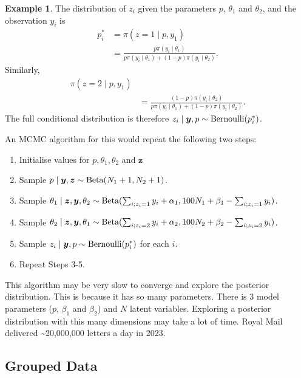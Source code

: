 \documentclass[
]{book}
\providecommand{\tightlist}{%
  \setlength{\itemsep}{0pt}\setlength{\parskip}{0pt}}
\theoremstyle{definition}
\theoremstyle{definition}
\newtheorem{example}{Example}[chapter]
\theoremstyle{definition}
\theoremstyle{definition}
\theoremstyle{remark}
\begin{document}
\begin{example}
The distribution of \(z_i\) given the parameters \(p\), \(\theta_1\) and \(\theta_2\), and the observation \(y_i\) is
\begin{align*}
p^*_i & = \pi(z = 1 \mid p, y_1) \\
&= \frac{p\pi(y_i \mid \theta_1)}{p\pi(y_i \mid \theta_1) + (1-p)\pi(y_i \mid \theta_2)}.
\end{align*}
Similarly,
\begin{align*}
\pi(z = 2 \mid p, y_1) \\
&= \frac{(1-p)\pi(y_i \mid \theta_2)}{p\pi(y_i \mid \theta_1) + (1-p)\pi(y_i \mid \theta_2)}.
\end{align*}
The full conditional distribution is therefore \(z_i \mid \boldsymbol{y}, p \sim \hbox{Bernoulli}(p^*_i)\).

An MCMC algorithm for this would repeat the following two steps:

\begin{enumerate}
\def\labelenumi{\arabic{enumi}.}
\tightlist
\item
  Initialise values for \(p, \theta_1, \theta_2\) and \(\boldsymbol{z}\)
\item
  Sample \(p \mid \boldsymbol{y}, \boldsymbol{z} \sim \hbox{Beta}(N_1 + 1, N_2 + 1)\).
\item
  Sample \(\theta_1 \mid \boldsymbol{z}, \boldsymbol{y}, \theta_2 \sim\hbox{Beta}(\sum_{i; z_i = 1}y_i + \alpha_1 , 100N_1 + \beta_1 - \sum_{i; z_i = 1}y_i)\).
\item
  Sample \(\theta_2 \mid \boldsymbol{z}, \boldsymbol{y}, \theta_1 \sim \hbox{Beta}(\sum_{i; z_i = 2}y_i + \alpha_2 , 100N_2 + \beta_2 - \sum_{i; z_i = 2}y_i)\).
\item
  Sample \(z_i \mid \boldsymbol{y}, p \sim \hbox{Bernoulli}(p^*_i)\) for each \(i\).
\item
  Repeat Steps 3-5.
\end{enumerate}

This algorithm may be very slow to converge and explore the posterior distribution. This is because it has so many parameters. There is 3 model parameters (\(p\), \(\beta_1\) and \(\beta_2\)) and \(N\) latent variables. Exploring a posterior distribution with this many dimensions may take a lot of time. Royal Mail delivered \textasciitilde20,000,000 letters a day in 2023.
\end{example}

\hypertarget{grouped-data}{%
\subsection{Grouped Data}\label{grouped-data}}
\end{document}
